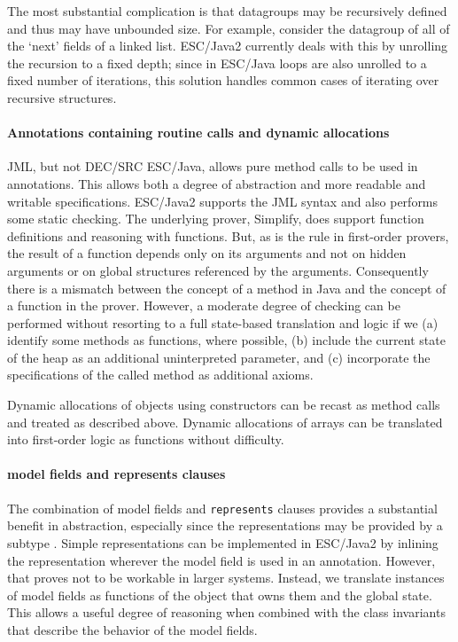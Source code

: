 \documentclass{article}
\begin{document}
The most substantial complication is that datagroups may be recursively defined and
thus may have unbounded size.  For example, consider the datagroup of all of the `next' fields of a 
linked list.  ESC/Java2 currently deals with this by unrolling the recursion to a fixed
depth; since in ESC/Java loops are also unrolled to a fixed number of iterations, this solution
handles common cases of iterating over recursive structures.

\paragraph*{Annotations containing routine calls and dynamic allocations}
JML, but not DEC/SRC ESC/Java, allows pure method calls to be used in annotations.  This allows both a degree of 
abstraction and more readable and writable specifications. 
ESC/Java2 supports the JML syntax and also performs some static checking.
The underlying prover, Simplify, does support function definitions and reasoning with
functions.  But, as is the rule in first-order provers, the result of a function depends
only on its arguments and not on hidden arguments or on global structures referenced by
the arguments.  Consequently there is a mismatch between the concept of a method in Java
and the concept of a function in the prover.  
However, a moderate degree of checking can be performed without
resorting to a full state-based translation and logic if we (a) identify some methods
as functions, where possible, (b) include the current state of the
heap as an additional uninterpreted parameter, and (c) incorporate the specifications of the called
method as additional axioms.  

Dynamic allocations of objects using constructors can be recast as method calls and treated as described above.
Dynamic allocations of arrays can be translated into first-order logic as functions without difficulty.


\paragraph*{model fields and represents clauses}
The combination of model fields and \texttt{represents} clauses
provides a substantial benefit in abstraction, especially since the
representations may be provided by a subtype \cite{Cheon-etal03}.  Simple representations
can be implemented in ESC/Java2 by inlining the representation wherever
the model field is used in an annotation.  However, that proves not to be workable
in larger systems.  Instead, we translate instances of model fields as functions of
the object that owns them and the global state.  This allows a useful
degree of reasoning when combined with the class invariants
that describe the behavior of the model fields.
\end{document}
